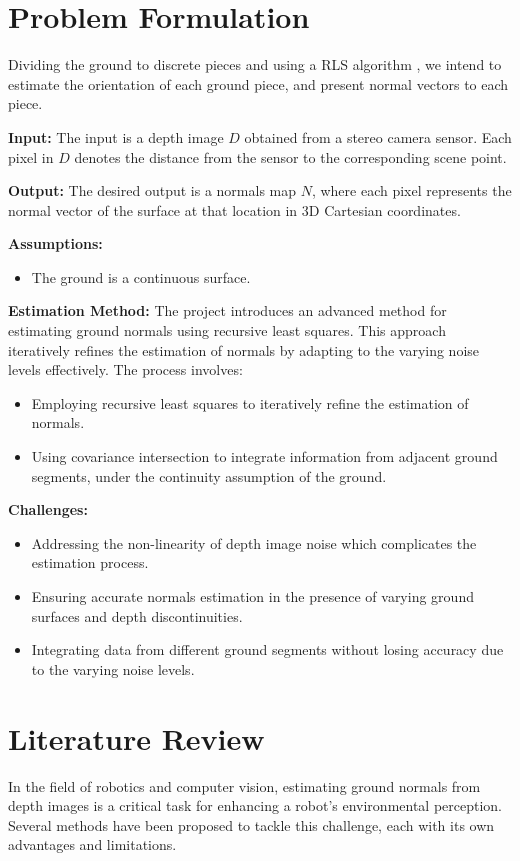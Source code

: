 \documentclass[12pt,a4paper,oneside,onecolumn]{book}
\begin{document}
\chapter{Problem Formulation}
Dividing the ground to discrete pieces and using a RLS algorithm , we intend to estimate  the orientation of each ground piece, and present normal vectors to each piece. 


    \textbf{Input:} The input is a depth image \( D \) obtained from a stereo camera sensor. Each pixel in \( D \) denotes the distance from the sensor to the corresponding scene point.
    
     \textbf{Output:} The desired output is a normals map \( N \), where each pixel represents the normal vector of the surface at that location in 3D Cartesian coordinates.
    
     \textbf{Assumptions:}
    \begin{itemize}
        \item The ground is a continuous surface.
    \end{itemize}
    
     \textbf{Estimation Method:} The project introduces an advanced method for estimating ground normals using recursive least squares. This approach iteratively refines the estimation of normals by adapting to the varying noise levels effectively. The process involves:
    \begin{itemize}
        \item Employing recursive least squares to iteratively refine the estimation of normals.
        \item Using covariance intersection to integrate information from adjacent ground segments, under the continuity assumption of the ground.
    \end{itemize}
    
     \textbf{Challenges:}
    \begin{itemize}
        \item Addressing the non-linearity of depth image noise which complicates the estimation process.
        \item Ensuring accurate normals estimation in the presence of varying ground surfaces and depth discontinuities.
        \item Integrating data from different ground segments without losing accuracy due to the varying noise levels.
    \end{itemize}
    



\chapter{Literature Review}
In the field of robotics and computer vision, estimating ground normals from depth images is a critical task for enhancing a robot's environmental perception. Several methods have been proposed to tackle this challenge, each with its own advantages and limitations.
\end{document}
